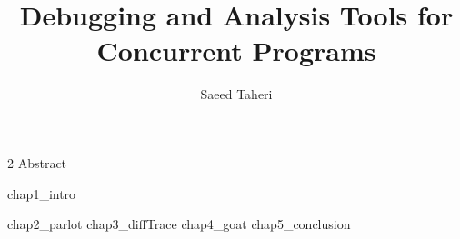 \documentclass[11pt,Chicago]{uuthesis2e}
\author                 {Saeed Taheri}
\title                  {Debugging and Analysis Tools for Concurrent Programs}
\begin{document}


\frontmatterformat
\titlepage
\copyrightpage
\dissertationapproval
\setcounter {page}     {2}             %
 {Abstract}
\dedicationpage
\tableofcontents
\listoffigures
\listoftables
%





\maintext       %

\pagestyle{headings} %

 {chap1_intro}

 {chap2_parlot}
 {chap3_diffTrace}
 {chap4_goat}
 {chap5_conclusion}


\end{document}
